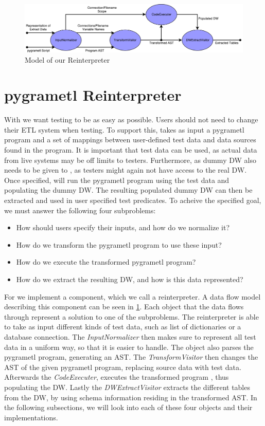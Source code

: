 \begin{figure}
  \centering
  \includegraphics[width=1\textwidth]{figures/reinterpreter_model.pdf}
  \caption{Model of our Reinterpreter}
  \label{fig:reinterpreter}
\end{figure}

\section{pygrametl Reinterpreter}
With  \FW{} we want testing to be as easy as possible. Users should not need to  change their ETL system when testing. To support this, \FW{} takes as input a pygrametl program and a set of mappings between user-defined test data and data sources found in the program. It is important that test data can be used, as actual data from live systems may be off limits to testers. Furthermore, as dummy DW also needs to be given to \FW{}, as testers might again not have access to the real DW. Once specified, \FW{} will run the pygrametl program using the test data and populating the dummy DW. The resulting populated dummy DW can then be extracted and used in user specified test predicates. To acheive the specified goal, we must answer the following four subproblems: 

\begin{itemize}
\item How should users specify their inputs, and how do we normalize it?
\item How do we transform the pygrametl program to use these input?
\item How do we execute the transformed pygrametl program?
\item How do we extract the resulting DW, and how is this data represented? 
\end{itemize}

For \FW{} we implement a component, which we call a reinterpreter. A data flow model describing this component can be seen in \cref{fig:reinterpreter}. Each object that the data flows through represent a solution to one of the subproblems. The reinterpreter is able to take as input different kinds of test data, such as list of dictionaries or a database connection. The \textit{InputNormalizer} then makes sure to represent all test data in a uniform way, so that it is easier to handle. The object also parses the pygrametl program, generating an AST. The \textit{TransformVisitor} then changes the AST of the given pygrametl program, replacing source data with test data. Afterwards the \textit{CodeExecuter}, executes the transformed program , thus populating the DW. Lastly the \textit{DWExtractVisitor} extracts the different tables from the DW, by using schema information residing in the transformed AST. In the following subsections, we will look into each of these four objects and their implementations.

